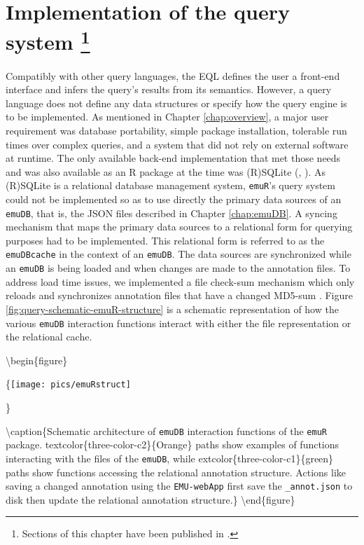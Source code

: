 \documentclass[
]{book}
\begin{document}
\hypertarget{chap:querysys-impl}{%
\chapter[Implementation of the query system ]{\texorpdfstring{Implementation of the query system \footnote{Sections of this chapter have been published in \citet{winkelmann:2017aa}.}}{Implementation of the query system }}\label{chap:querysys-impl}}

Compatibly with other query languages, the EQL defines the user a front-end interface and infers the query's results from its semantics. However, a query language does not define any data structures or specify how the query engine is to be implemented. As mentioned in Chapter \ref{chap:overview}, a major user requirement was database portability, simple package installation, tolerable run times over complex queries, and a system that did not rely on external software at runtime. The only available back-end implementation that met those needs and was also available as an R package at the time was (R)SQLite (\citet{hipp:2007a}, \citet{wickham:2014a}). As (R)SQLite is a relational database management system, \texttt{emuR}'s query system could not be implemented so as to use directly the primary data sources of an \texttt{emuDB}, that is, the JSON files described in Chapter \ref{chap:emuDB}. A syncing mechanism that maps the primary data sources to a relational form for querying purposes had to be implemented. This relational form is referred to as the \texttt{emuDBcache} in the context of an \texttt{emuDB}. The data sources are synchronized while an \texttt{emuDB} is being loaded and when changes are made to the annotation files. To address load time issues, we implemented a file check-sum mechanism which only reloads and synchronizes annotation files that have a changed MD5-sum \citep{rivest:1992a}. Figure \ref{fig:query-schematic-emuR-structure} is a schematic representation of how the various \texttt{emuDB} interaction functions interact with either the file representation or the relational cache.

\textbackslash begin\{figure\}

\{\centering \texttt{[image: pics/emuRstruct]}

\}

\textbackslash caption\{Schematic architecture of \texttt{emuDB} interaction functions of the \texttt{emuR} package. textcolor\{three-color-c2\}\{Orange\} paths show examples of functions interacting with the files of the \texttt{emuDB}, while extcolor\{three-color-c1\}\{green\} paths show functions accessing the relational annotation structure. Actions like saving a changed annotation using the \texttt{EMU-webApp} first save the \texttt{\_annot.json} to disk then update the relational annotation structure.\}\label{fig:query-schematic-emuR-structure}
\textbackslash end\{figure\}
\end{document}
